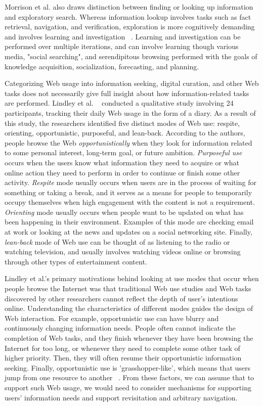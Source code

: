 {{{Morrison et al. also draws distinction between finding or looking up information and exploratory search. Whereas information lookup involves tasks such as fact retrieval, navigation, and verification, exploration is more cognitively demanding and involves learning and investigation ~\cite{marchionini}. Learning and investigation can be performed over multiple iterations, and can involve learning though various media, "social searching", and serendipitous browsing performed with the goals of knowledge acquisition, socialization, forecasting, and planning.  

Categorizing Web usage into information seeking, digital curation, and other Web tasks does not necessarily give full insight about how information-related tasks are performed. Lindley et al. ~\cite{lindley} conducted a qualitative study involving 24 participants, tracking their daily Web usage in the form of a diary. As a result of this study, the researchers identified five distinct modes of Web use: respite, orienting, opportunistic, purposeful, and lean-back. According to the authors, people browse the Web \textit{opportunistically} when they look for information related to some personal interest, long-term goal, or future ambition. \textit{Purposeful use} occurs when the users know what information they need to acquire or what online action they need to perform in order to continue or finish some other activity. \textit{Respite} mode usually occurs when users are in the process of waiting for something or taking a break, and it serves as a means for people to temporarily occupy themselves when high engagement with the content is not a requirement. \textit{Orienting} mode usually occurs when people want to be updated on what has been happening in their environment. Examples of this mode are checking email at work or looking at the news and updates on a social networking site. Finally, \textit{lean-back} mode of Web use can be thought of as listening to the radio or watching television, and usually involves watching videos online or browsing through other types of entertainment content. 

Lindley et al.'s primary motivations behind looking at use modes that occur when people browse the Internet was that traditional Web use studies and Web tasks discovered by other researchers cannot reflect the depth of user's intentions online. Understanding the characteristics of different modes guides the design of Web interaction. For example, opportunistic use can have blurry and continuously changing information needs. People often cannot indicate the completion of Web tasks, and they finish whenever they have been browsing the Internet for too long, or whenever they need to complete some other task of higher priority. Then, they will often resume their opportunistic information seeking. Finally, opportunistic use is 'grasshopper-like', which means that users jump from one resource to another ~\cite{lindley}. From these factors, we can assume that to support such Web usage, we would need to consider mechanisms for supporting users' information needs and support revisitation and arbitrary navigation.

}}}
